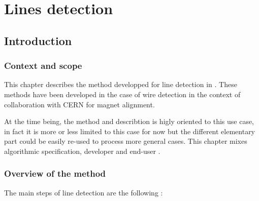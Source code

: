\chapter{Lines detection}
\label{Chap:LineDetect}



\section{Introduction}


\subsection{Context and scope}

This chapter describes the method developped for line detection in \PPP. 
These methods have been developed in the case of wire detection in the context
of collaboration with CERN for magnet alignment.

At the time being, the method and describtion is  higly oriented to this use case,
in fact it is more or less limited to this case for now  but the different elementary
part could be easily re-used to process more general cases. This chapter mixes
algorithmic specification, developer and end-user .


\subsection{Overview of the method}

The main steps of line detection are the following :

